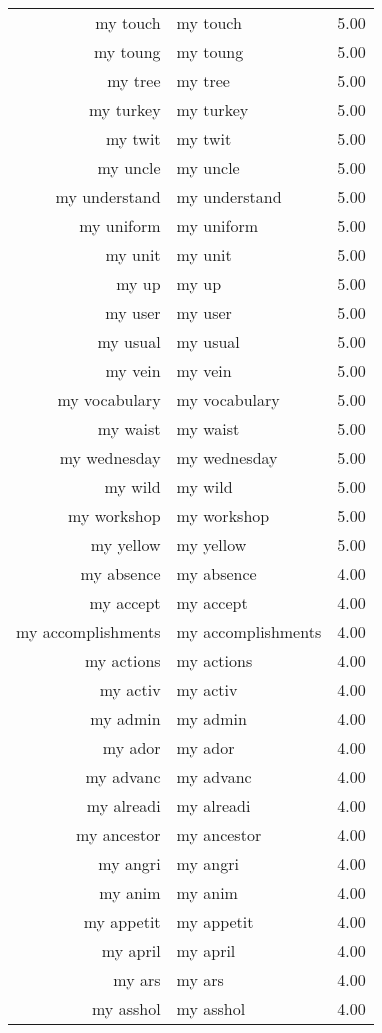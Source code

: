 \begin{table}[ht]
\begin{tabular}{rlr}
  my touch & my touch & 5.00 \\ 
  my toung & my toung & 5.00 \\ 
  my tree & my tree & 5.00 \\ 
  my turkey & my turkey & 5.00 \\ 
  my twit & my twit & 5.00 \\ 
  my uncle & my uncle & 5.00 \\ 
  my understand & my understand & 5.00 \\ 
  my uniform & my uniform & 5.00 \\ 
  my unit & my unit & 5.00 \\ 
  my up & my up & 5.00 \\ 
  my user & my user & 5.00 \\ 
  my usual & my usual & 5.00 \\ 
  my vein & my vein & 5.00 \\ 
  my vocabulary & my vocabulary & 5.00 \\ 
  my waist & my waist & 5.00 \\ 
  my wednesday & my wednesday & 5.00 \\ 
  my wild & my wild & 5.00 \\ 
  my workshop & my workshop & 5.00 \\ 
  my yellow & my yellow & 5.00 \\ 
  my absence & my absence & 4.00 \\ 
  my accept & my accept & 4.00 \\ 
  my accomplishments & my accomplishments & 4.00 \\ 
  my actions & my actions & 4.00 \\ 
  my activ & my activ & 4.00 \\ 
  my admin & my admin & 4.00 \\ 
  my ador & my ador & 4.00 \\ 
  my advanc & my advanc & 4.00 \\ 
  my alreadi & my alreadi & 4.00 \\ 
  my ancestor & my ancestor & 4.00 \\ 
  my angri & my angri & 4.00 \\ 
  my anim & my anim & 4.00 \\ 
  my appetit & my appetit & 4.00 \\ 
  my april & my april & 4.00 \\ 
  my ars & my ars & 4.00 \\ 
  my asshol & my asshol & 4.00 \\ 

\end{tabular}
\end{table}
